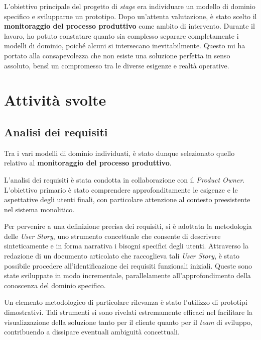     \vspace{0.2 em}
    \noindent L'obiettivo principale del progetto di \textit{stage} era individuare un modello di dominio specifico e svilupparne un prototipo. Dopo un'attenta valutazione, è stato scelto il \textbf{monitoraggio del processo produttivo} come ambito di intervento. Durante il lavoro, ho potuto constatare quanto sia complesso separare completamente i modelli di dominio, poiché alcuni si intersecano inevitabilmente. Questo mi ha portato alla consapevolezza che non esiste una soluzione perfetta in senso assoluto, bensì un compromesso tra le diverse esigenze e realtà operative. 
    
    
    \section{Attività svolte}
        \subsection{Analisi dei requisiti}
        Tra i vari modelli di dominio individuati, è stato dunque selezionato quello relativo al \textbf{monitoraggio del processo produttivo}.

        \vspace{0.2 em}
        \noindent L'analisi dei requisiti è stata condotta in collaborazione con il \textit{Product Owner}. L'obiettivo primario è stato comprendere approfonditamente le esigenze e le aspettative degli utenti finali, con particolare attenzione al contesto preesistente nel sistema monolitico.
        
        \vspace{0.2 em}
        \noindent Per pervenire a una definizione precisa dei requisiti, si è adottata la metodologia delle \textit{User Story}, uno strumento concettuale che consente di descrivere sinteticamente e in forma narrativa i bisogni specifici degli utenti. Attraverso la redazione di un documento articolato che raccoglieva tali \textit{User Story}, è stato possibile procedere all'identificazione dei requisiti funzionali iniziali. Queste sono state sviluppate in modo incrementale, parallelamente all'approfondimento della conoscenza del dominio specifico.
        
        \vspace{0.2 em}
        \noindent Un elemento metodologico di particolare rilevanza è stato l'utilizzo di prototipi dimostrativi. Tali strumenti si sono rivelati estremamente efficaci nel facilitare la visualizzazione della soluzione tanto per il cliente quanto per il \textit{team} di sviluppo, contribuendo a dissipare eventuali ambiguità concettuali.

